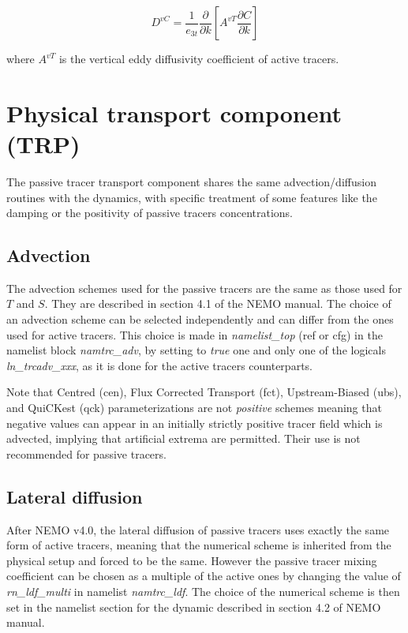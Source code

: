 \documentclass[../main/TOP_manual]{subfiles}
\begin{document}
\begin{equation}
D^{vC} =  \frac{1}{e_{3t}} \frac{\partial}{\partial k} \left[  A^{vT} \frac{\partial C}{\partial k} \right]
\label{Eq_trczdf}
\end{equation}

where $A^{vT}$ is the vertical eddy diffusivity coefficient of active tracers.

\section{Physical transport component (TRP)}

The passive tracer transport component shares the same advection/diffusion routines with the dynamics, with specific treatment of some features like the damping or the positivity of passive tracers concentrations.

\subsection{Advection}

The advection schemes used for the passive tracers are the same as those used for $T$ and $S$. They are described in section 4.1 of the NEMO manual.
The choice of an advection scheme can be selected independently and can differ from the ones used for active tracers.
This choice is made in \textit{namelist\_top} (ref or cfg) in the namelist block \textit{namtrc\_adv}, by setting to \textit{true} one and only one of the logicals \textit{ln\_trcadv\_xxx}, as it is done for the active tracers counterparts.

Note that Centred (cen), Flux Corrected Transport (fct), Upstream-Biased (ubs), and QuiCKest (qck) parameterizations are not \textit{positive} schemes meaning that negative values can appear in an initially strictly positive tracer field which is advected, implying that artificial extrema are permitted. Their use is not recommended for passive tracers.


\subsection{Lateral diffusion}

After NEMO v4.0, the lateral diffusion of passive tracers uses exactly the same form of active tracers, meaning that the numerical scheme is inherited from the physical setup and forced to be the same.
However the passive tracer mixing coefficient can be chosen as a multiple of the active ones by changing the value of \textit{rn\_ldf\_multi} in namelist \textit{namtrc\_ldf}.
The choice of the numerical scheme is then set in the  namelist section for the dynamic described in section 4.2 of NEMO manual.
\end{document}
